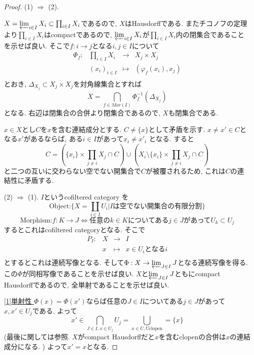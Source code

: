 \documentclass[dvipdfmx,a4paper,11pt]{report}
\theoremstyle{definition}
\begin{document}
\begin{proof}
(1) $\Rightarrow$ (2).

$X = \varprojlim_{i \in I} X_{i} \subset \prod_{i \in I} X_{i}$であるので, $X$はHausdorffである.
またチコノフの定理より$\prod_{i \in I} X_{i}$はcompactであるので, $\varprojlim_{i \in I} X_{i}$が$\prod_{i \in I} X_{i}$内の閉集合であることを示せば良い. 
そこで$f : i \to j$となる$i,j \in I$について
 $$
\begin{array}{cccc}
\Phi_{f}: &\prod_{i \in I} X_{i}& \rightarrow &X_j \times X_{j}  \\
&(x_{i})_{i \in I}& \longmapsto & (\varphi_{f}(x_{i}), x_j) \\
\end{array}
$$
とおき, $\Delta_{X_{j} }\subset X_{j} \times X_{j}$を対角線集合とすれば
$$
X = \bigcap_{f \in Mor(I)}\Phi_{f}^{-1}(\Delta_{X_{j} })
$$
となる. 右辺は閉集合の合併より閉集合であるので, $X$も閉集合である.

$x \in X$とし$C$を$x$を含む連結成分とする. $C \neq \{x\}$として矛盾を示す.
$x \neq x' \in C$となる$x'$があるならば, ある$i \in I$があって$x_{i} \neq x'_{i}$ となる.
すると
$$
C = \left(\{x_{i}\} \times \prod_{j \neq i} X_{j} \cap C\right) \cup \left(X_{i} \setminus \{x_{i}\} \times \prod_{j \neq i} X_{j} \cap C\right)
$$
と二つの互いに交わらない空でない開集合で$C$が被覆されるため, これは$C$の連結性に矛盾する.

(2) $\Rightarrow$ (1).
$I$というcofiltered category を
$$
\text{Object:} \{ X = \coprod_{i \in I} U_{i} | \text{$I$は空でない開集合の有限分割}\}
$$
$$
\text{Morphism:} f : K \to J \Leftrightarrow \text{任意の$k \in K$についてある$j \in J$があって$U_{k} \subset U_{j}$}
$$
するとこれはcofiltered categoryとなる. 
そこで
 $$
\begin{array}{cccc}
P_{I} : &X& \rightarrow &I  \\
&x& \longmapsto & \text{$x \in U_{i}$となる$i$} \\
\end{array}
$$
とするとこれは連続写像となる.
そして$\Phi : X \to \varprojlim_{J \in I} J$となる連続写像を得る.
この$\Phi$が同相写像であることを示せば良い.
$ X$と$ \varprojlim_{J \in I} J$ともにcompact Hausdorffであるので, 全単射であることを示せば良い.

\underline{[1]単射性 }
$\Phi(x) = \Phi(x')$ならば任意の$J \in I$についてある$j \in J$があって$x, x' \in U_{j}$である.
よって
$$
x' \in \bigcap_{J \in I, x \in U_{j}}U_{j} = \bigcup_{x \in U,  U \text{clopen}}=\{x\}
$$
(最後に関しては\cite[5.12.10]{Sta}参照. $X$がcompact Hausdorffだと$x$を含むclopenの合併は$x$の連結成分になる. )
よって$x' =x$となる.


\end{proof}
\end{document}
